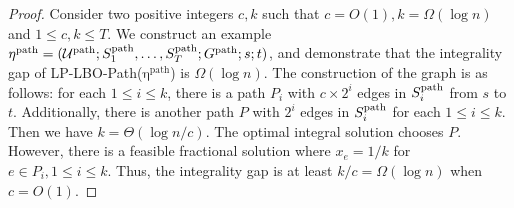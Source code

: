 \documentclass[11pt,a4paper]{article} \usepackage{enumitem}
\newcommand{\calU}{\mathcal{U}}
\newcommand{\pathU}{\operatorname{\calU^{path}}}
\newcommand{\pathS}[1]{\ifx\relax#1\relax
    S^{\operatorname{path}} \else
    S^{\operatorname{path}}_{#1} \fi
}
\newcommand{\patheta}{\operatorname{\eta^{path}}}
\newcommand{\pathG}{G^{\operatorname{path}}}
\theoremstyle{definition}
\begin{document}
\begin{proof}
Consider two positive integers $c,k$ such that $c=O(1),k=\Omega(\log n)$ and $1\leq c,k\leq T$. We construct an example
$\patheta = (\pathU; \pathS{1}, \ldots, \pathS{T}; \pathG; s; t)$, and demonstrate that the integrality gap of LP-LBO-Path($\patheta$) is $\Omega(\log n)$.
The construction of the graph is as follows: for each $1 \leq i \leq k$, there is a path $P_i$ with $c \times 2^i$ edges in $\pathS{i}$ from $s$ to $t$. Additionally, there is another path $P$ with $2^i$ edges in $\pathS{i}$ for each $1 \leq i \leq k$.
Then we have $k = \Theta(\log n / c)$. The optimal integral solution chooses $P$. However, there is a feasible fractional solution where $x_e = 1/k$ for $e \in P_i,1\leq i\leq k$. Thus, the integrality gap is at least $k / c = \Omega(\log n)$ when $c = O(1)$.
\end{proof}
\end{document}

